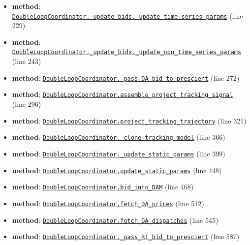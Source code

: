 \documentclass[11pt]{report}
\begin{document}
\begin{itemize}[leftmargin=*]
  \item \textbf{method}: \hyperref[def:coordinator.py:DoubleLoopCoordinator._update_bids._update_time_series_params:L229]{\texttt{DoubleLoopCoordinator.\_update\_bids.\_update\_time\_series\_params}} (line 229)
  \item \textbf{method}: \hyperref[def:coordinator.py:DoubleLoopCoordinator._update_bids._update_non_time_series_params:L243]{\texttt{DoubleLoopCoordinator.\_update\_bids.\_update\_non\_time\_series\_params}} (line 243)
  \item \textbf{method}: \hyperref[def:coordinator.py:DoubleLoopCoordinator._pass_DA_bid_to_prescient:L272]{\texttt{DoubleLoopCoordinator.\_pass\_DA\_bid\_to\_prescient}} (line 272)
  \item \textbf{method}: \hyperref[def:coordinator.py:DoubleLoopCoordinator.assemble_project_tracking_signal:L296]{\texttt{DoubleLoopCoordinator.assemble\_project\_tracking\_signal}} (line 296)
  \item \textbf{method}: \hyperref[def:coordinator.py:DoubleLoopCoordinator.project_tracking_trajectory:L321]{\texttt{DoubleLoopCoordinator.project\_tracking\_trajectory}} (line 321)
  \item \textbf{method}: \hyperref[def:coordinator.py:DoubleLoopCoordinator._clone_tracking_model:L366]{\texttt{DoubleLoopCoordinator.\_clone\_tracking\_model}} (line 366)
  \item \textbf{method}: \hyperref[def:coordinator.py:DoubleLoopCoordinator._update_static_params:L399]{\texttt{DoubleLoopCoordinator.\_update\_static\_params}} (line 399)
  \item \textbf{method}: \hyperref[def:coordinator.py:DoubleLoopCoordinator.update_static_params:L448]{\texttt{DoubleLoopCoordinator.update\_static\_params}} (line 448)
  \item \textbf{method}: \hyperref[def:coordinator.py:DoubleLoopCoordinator.bid_into_DAM:L468]{\texttt{DoubleLoopCoordinator.bid\_into\_DAM}} (line 468)
  \item \textbf{method}: \hyperref[def:coordinator.py:DoubleLoopCoordinator.fetch_DA_prices:L512]{\texttt{DoubleLoopCoordinator.fetch\_DA\_prices}} (line 512)
  \item \textbf{method}: \hyperref[def:coordinator.py:DoubleLoopCoordinator.fetch_DA_dispatches:L545]{\texttt{DoubleLoopCoordinator.fetch\_DA\_dispatches}} (line 545)
  \item \textbf{method}: \hyperref[def:coordinator.py:DoubleLoopCoordinator._pass_RT_bid_to_prescient:L587]{\texttt{DoubleLoopCoordinator.\_pass\_RT\_bid\_to\_prescient}} (line 587)

\end{itemize}
\end{document}
